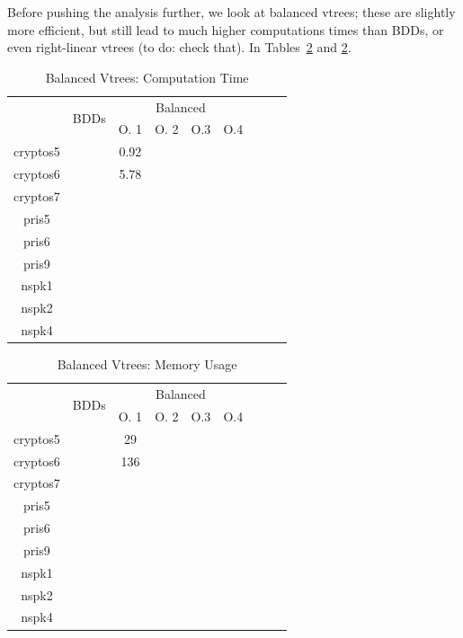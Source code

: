 \documentclass[11pt]{article}
\begin{document}
Before pushing the analysis further, we look at balanced vtrees; these are slightly more efficient, but still lead to much higher computations times than BDDs, or even right-linear vtrees (to do: check that). In Tables~\ref{table:otherstandardvtrees2memory} and \ref{table:otherstandardvtrees2memory}.

\begin{table}
\centering
\begin{tabular}{|*{9}{c|}}
\hline
 & \multirow{2}{*}{BDDs} & \multicolumn{4}{c|}{Balanced} \\ \cline{3-6}
 & & O. 1& O. 2 & O.3 & O.4 \\ \hline
cryptos5 & & 0.92 & & & \\ \hline
cryptos6 & & 5.78 & & & \\ \hline
cryptos7 & & & & & \\ \hline
pris5 & & & & & \\ \hline
pris6 & & & & & \\ \hline
pris9 & & & & & \\ \hline
nspk1 & & & & & \\ \hline
nspk2 & & & & & \\ \hline
nspk4 & & & & & \\ \hline
\end{tabular}
\caption{Balanced Vtrees: Computation Time}
\label{table:otherstandardvtrees2time}
\end{table}
\begin{table}
\centering
\begin{tabular}{|*{9}{c|}}
\hline
 & \multirow{2}{*}{BDDs} & \multicolumn{4}{c|}{Balanced} \\ \cline{3-6}
 & & O. 1& O. 2 & O.3 & O.4 \\ \hline
cryptos5 & & 29 & & & \\ \hline
cryptos6 & & 136 & & & \\ \hline
cryptos7 & & & & & \\ \hline
pris5 & & & & & \\ \hline
pris6 & & & & & \\ \hline
pris9 & & & & & \\ \hline
nspk1 & & & & & \\ \hline
nspk2 & & & & & \\ \hline
nspk4 & & & & & \\ \hline
\end{tabular}
\caption{Balanced Vtrees: Memory Usage}
\label{table:otherstandardvtrees2memory}
\end{table}
\end{document}
